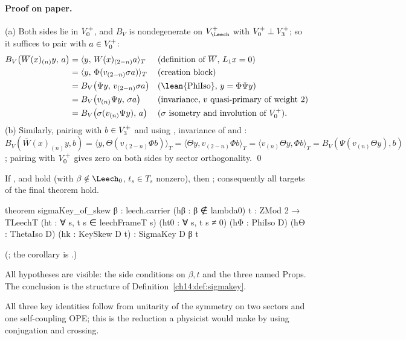 \paragraph{Proof on paper.}  (a) Both sides lie in $V_0^{+}$, and $B_V$ is nondegenerate on $V_\Leech^+$
with $V_0^{+}\perp V_3^{+}$; so it suffices to pair with $a\in V_0^{+}$:
\begin{align*}
B_V\bigl(\overline W(x)_{(n)}y,\,a\bigr)
 &=\langle y,\,W(x)_{(2-n)}a\rangle_T &&\text{(definition of }\overline W\text{, }L_1x=0)\\
 &=\langle y,\,\Phi(v_{(2-n)}\sigma a)\rangle_T &&\text{(creation block)}\\
 &=B_V\bigl(\Psi y,\,v_{(2-n)}\sigma a\bigr) &&\text{(\lean{PhiIso}, }y=\Phi\Psi y)\\
 &=B_V\bigl(v_{(n)}\Psi y,\,\sigma a\bigr) &&\text{(invariance, }v\text{ quasi-primary of weight 2)}\\
 &=B_V\bigl(\sigma(v_{(n)}\Psi y),\,a\bigr) &&(\sigma\text{ isometry and involution of }\chXIVA).
\end{align*}
(b) Similarly, pairing with $b\in V_3^{+}$ and using , invariance of  and
:
$B_V(\overline W(x)_{(n)}y,b)=\langle y,\Theta(v_{(2-n)}\Phi b)\rangle_T=\langle\Theta y,v_{(2-n)}\Phi b\rangle_T
=\langle v_{(n)}\Theta y,\Phi b\rangle_T=B_V(\Psi(v_{(n)}\Theta y),b)$; pairing with $V_0^{+}$ gives zero on both
sides by sector orthogonality. \qed

\begin{theorem}\label{ch14:thm:skew}
If ,  and  hold (with $\beta\notin\Leech_0$, $t_s\in T_s$
nonzero), then ; consequently all targets of the final theorem hold.
\end{theorem}
\begin{leancode}
theorem sigmaKey_of_skew {β : leech.carrier} (hβ : β ∉ lambda0) {t : ZMod 2 → TLeechT}
    (ht : ∀ s, t s ∈ leechFrameT s) (ht0 : ∀ s, t s ≠ 0)
    (hΦ : PhiIso D) (hΘ : ThetaIso D) (hk : KeySkew D t) : SigmaKey D β t
\end{leancode}
(; the corollary is .)

\begin{dictionary}
All hypotheses are visible: the side conditions on $\beta,t$ and the three named Props.  The conclusion
is the structure of Definition~\ref{ch14:def:sigmakey}.
\end{dictionary}
\begin{physics}
All three key identities follow from unitarity of the symmetry on two sectors and one self-coupling OPE; this is the reduction a physicist would make by using conjugation and crossing.
\end{physics}


